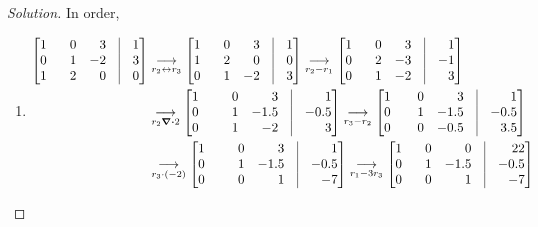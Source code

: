 \documentclass{article}
\let\olddiv\div
\theoremstyle{mystyle}
\begin{document}
\begin{proof}[Solution]
In order,
\begin{enumerate}
    \item 
    \begin{align*}
        \begin{bmatrix*}[r] 1 & 0 & 3 & \vline & 1 \\ 0 & \phantom{-}1 & -2 & \vline & 3 \\ 1 & 2 & 0 & \vline & 0 \end{bmatrix*} &\underset{r_{2}\leftrightarrow r_{3}}{\longrightarrow} \begin{bmatrix*}[r] 1 & 0 & 3 & \vline & 1 \\ 1 & 2 & 0 & \vline & 0 \\ 0 & \phantom{-}1 & -2 & \vline & 3 \end{bmatrix*} \underset{r_{2}-r_{1}}{\longrightarrow} \begin{bmatrix*}[r] 1 & 0 & 3 & \vline & 1 \\ 0 & \phantom{-} 2 & -3 & \vline & -1 \\ 0 & 1 & -2 & \vline & 3 \end{bmatrix*}\\
        &\underset{r_{2}\olddiv 2}{\longrightarrow} \begin{bmatrix*}[r] 1 & 0 & 3 & \vline & 1 \\ 0 & 1 & -1.5 & \vline & -0.5 \\ 0 & \phantom{-1.}1 & -2 & \vline & 3\end{bmatrix*} \underset{r_{3}-r_{2}}{\longrightarrow} \begin{bmatrix*}[r] 1 & 0 & 3 & \vline & 1 \\ 0 & 1 & -1.5 & \vline & -0.5 \\ 0 & \phantom{-.}0 & -0.5 & \vline & 3.5 \end{bmatrix*}\\
        &\underset{r_{3}\cdot(-2)}{\longrightarrow} \begin{bmatrix*}[r] 1 & 0 & 3 & \vline & 1 \\ 0 & \phantom{-.5}1 & -1.5 & \vline & -0.5 \\ 0 & 0 & 1 & \vline & -7 \end{bmatrix*} \underset{r_{1}-3r_{3}}{\longrightarrow} \begin{bmatrix*}[r] 1 & 0 & 0 & \vline & 22 \\ 0 & 1 & -1.5 & \vline & -0.5 \\ 0 & \phantom{-}0 & \phantom{-}1 & \vline & -7 \end{bmatrix*}\\

\end{align*}
\end{enumerate}
\end{proof}
\end{document}
